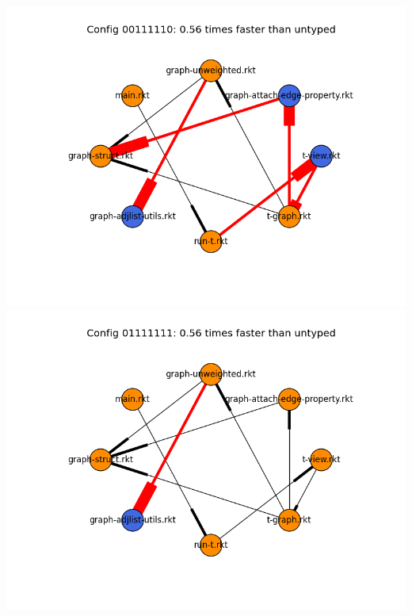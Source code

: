 \documentclass{article}
\begin{document}
\includegraphics[width=\textwidth]{mbta+graph-2015-04-20-module-graph-00111110.png}
\includegraphics[width=\textwidth]{mbta+graph-2015-04-20-module-graph-01111111.png}
\end{document}

